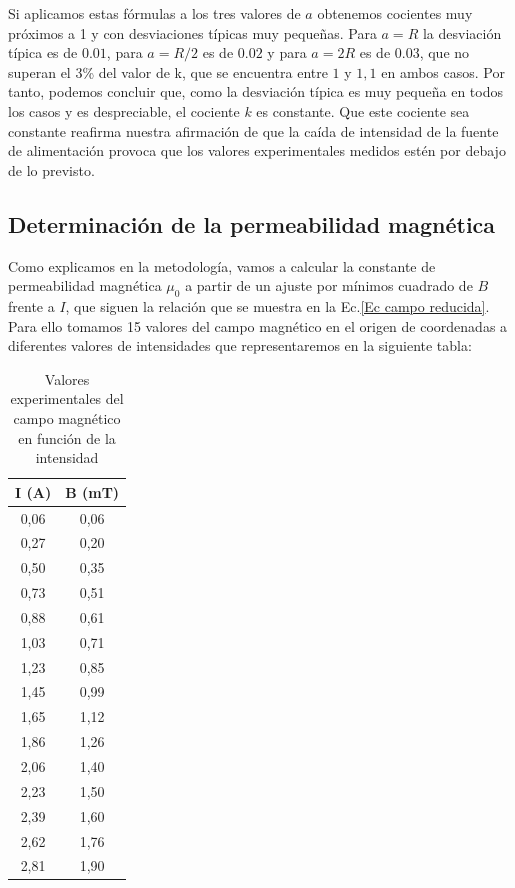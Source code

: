 \documentclass[a4paper,12pt,titlepage]{article}
\begin{document}
Si aplicamos estas fórmulas a los tres valores de $a$ obtenemos cocientes muy próximos a 1 y con desviaciones típicas muy pequeñas. Para $a=R$ la desviación típica es de $0.01$, para $a=R/2$ es de $0.02$ y para $a=2R$ es de $0.03$, que no superan el 3\% del valor de k, que se encuentra entre $1$ y $1,1$ en ambos casos. Por tanto, podemos concluir que, como la desviación típica es muy pequeña en todos los casos y es despreciable, el cociente $k$ es constante. Que este cociente sea constante reafirma nuestra afirmación de que la caída de intensidad de la fuente de alimentación provoca que los valores experimentales medidos estén por debajo de lo previsto.

\newpage

\subsection{Determinación de la permeabilidad magnética}

Como explicamos en la metodología, vamos a calcular la constante de permeabilidad magnética $\mu_0$ a partir de un ajuste por mínimos cuadrado de $B$ frente a $I$, que siguen la relación que se muestra en la Ec.\ref{Ec campo reducida}. Para ello tomamos 15 valores del campo magnético en el origen de coordenadas a diferentes valores de intensidades que representaremos en la siguiente tabla:

\begin{table}[h]
    \centering
    \begin{tabular}{|c|c|}
    \hline
    I (A) & B (mT) \\ \hline
    0,06  & 0,06   \\ \hline
    0,27  & 0,20    \\ \hline
    0,50   & 0,35   \\ \hline
    0,73  & 0,51   \\ \hline
    0,88  & 0,61   \\ \hline
    1,03  & 0,71   \\ \hline
    1,23  & 0,85   \\ \hline
    1,45  & 0,99   \\ \hline
    1,65  & 1,12   \\ \hline
    1,86  & 1,26   \\ \hline
    2,06  & 1,40    \\ \hline
    2,23  & 1,50   \\ \hline
    2,39  & 1,60    \\ \hline
    2,62  & 1,76   \\ \hline
    2,81  & 1,90    \\ \hline
    \end{tabular}
    \caption{Valores experimentales del campo magnético en función de la intensidad}
    \label{tab:my-table}
\end{table}
\end{document}
